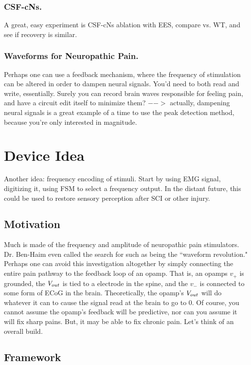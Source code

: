 \subsubsection{CSF-cNs.}

A great, easy experiment is CSF-cNs ablation with EES, compare vs. WT, and see if recovery is similar.  


\subsubsection{Waveforms for Neuropathic Pain.}
Perhaps one can use a feedback mechanism, where the frequency of stimulation can be altered in order to dampen neural signals. You'd need to both read and write, essentially. Surely you can record brain waves responsible for feeling pain, and have a circuit edit itself to minimize them? $-->$ actually, dampening neural signals is a great example of a time to use the peak detection method, because you're only interested in magnitude. 

\section{Device Idea}

Another idea: frequency encoding of stimuli. Start by using EMG signal, digitizing it, using FSM to select a frequency output. In the distant future, this could be used to restore sensory perception after SCI or other injury. 






\subsection{Motivation}
Much is made of the frequency and amplitude of neuropathic pain stimulators. Dr. Ben-Haim even called the search for such as being the ``waveform revolution." Perhaps one can avoid this investigation altogether by simply connecting the entire pain pathway to the feedback loop of an opamp. That is, an opamps $v_+$ is grounded, the ${V}_{out}$ is tied to a electrode in the spine, and the $v_-$ is connected to some form of ECoG in the brain. Theoretically, the opamp's ${V}_{out}$ will do whatever it can to cause the signal read at the brain to go to 0. Of course, you cannot assume the opamp's feedback will be predictive, nor can you assume it will fix sharp pains. But, it may be able to fix chronic pain. Let's think of an overall build. 

\subsection{Framework}

